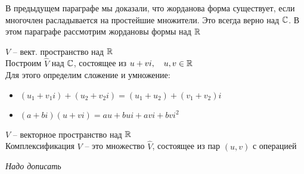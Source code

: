 В предыдущем параграфе мы доказали, что жорданова форма существует, если многочлен расладывается на простейшие множители. Это всегда верно над $ \mathbb{C} $. В этом параграфе рассмотрим жордановы формы над $ \mathbb{R} $

\begin{undefthm}
	$ V $ -- вект. пространство над $ \mathbb{R} $ \\
	Построим $ \hat{V} $ над $ \mathbb{C} $, состоящее из $ u + vi, \quad u, v \in \mathbb{R} $ \\
	Для этого определим сложение и умножение:
	\begin{itemize}
		\item $ (u_1 + v_1i) + (u_2 + v_2i) = (u_1 + u_2) + (v_1 + v_2)i $
		\item $ (a + bi)(u + vi) = au + bui + avi + bvi^2 $
	\end{itemize}
\end{undefthm}

\begin{definition}
	$ V $ -- векторное пространство над $ \mathbb{R} $ \\
	Комплексификация $ V $ -- это множество $ \hat{V} $, состоящее из пар $ (u, v) $ с операцией
\end{definition}

\textit{Надо дописать}
